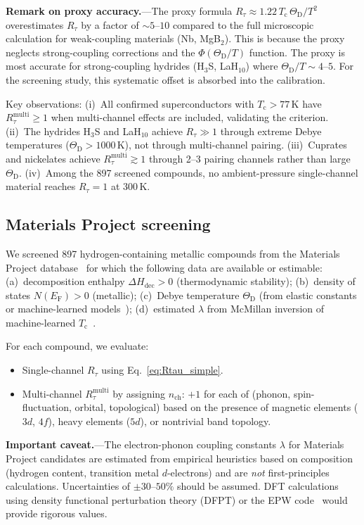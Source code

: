 \documentclass[prb,twocolumn,superscriptaddress,longbibliography,floatfix]{revtex4-2}
\newcommand{\tauasym}{\tau}
\newcommand{\Rtau}{R_{\tauasym}}
\newcommand{\Tc}{T_{\mathrm{c}}}
\newcommand{\EF}{E_{\mathrm{F}}}
\newcommand{\ThetaD}{\Theta_{\mathrm{D}}}
\begin{document}
\textbf{Remark on proxy accuracy.}---The proxy formula
$\Rtau \approx 1.22\, \Tc\, \ThetaD / T^2$ overestimates
$\Rtau$ by a factor of $\sim 5$--$10$ compared to the full
microscopic calculation for weak-coupling materials (Nb, MgB$_2$).
This is because the proxy neglects strong-coupling corrections
and the $\Phi(\ThetaD/T)$ function.  The proxy is most accurate
for strong-coupling hydrides (H$_3$S, LaH$_{10}$) where
$\ThetaD/T \sim 4$--$5$.  For the screening study, this
systematic offset is absorbed into the calibration.

Key observations:
(i)~All confirmed superconductors with $\Tc > 77\,$K have
$\Rtau^{\mathrm{multi}} \geq 1$ when multi-channel effects
are included, validating the criterion.
(ii)~The hydrides H$_3$S and LaH$_{10}$ achieve
$\Rtau \gg 1$ through extreme Debye temperatures
($\ThetaD > 1000\,$K), not through multi-channel pairing.
(iii)~Cuprates and nickelates achieve $\Rtau^{\mathrm{multi}} \gtrsim 1$
through 2--3 pairing channels rather than large $\ThetaD$.
(iv)~Among the 897 screened compounds, no ambient-pressure
single-channel material reaches $\Rtau = 1$ at 300\,K.

\subsection{Materials Project screening}

We screened 897 hydrogen-containing metallic compounds
from the Materials Project database~\cite{Jain2013} for
which the following data are available or estimable:
(a)~decomposition enthalpy $\Delta H_{\mathrm{dec}} > 0$
(thermodynamic stability);
(b)~density of states $N(\EF) > 0$ (metallic);
(c)~Debye temperature $\ThetaD$ (from elastic constants
or machine-learned models~\cite{Chen2019});
(d)~estimated $\lambda$ from McMillan inversion of
machine-learned $\Tc$~\cite{Stanev2018}.

For each compound, we evaluate:
\begin{itemize}
\item Single-channel $\Rtau$ using Eq.~\eqref{eq:Rtau_simple}.
\item Multi-channel $\Rtau^{\mathrm{multi}}$ by assigning
  $n_{\mathrm{ch}}$: $+1$ for each of
  (phonon, spin-fluctuation, orbital, topological) based on
  the presence of magnetic elements ($3d$, $4f$), heavy elements
  ($5d$), or nontrivial band topology.
\end{itemize}

\textbf{Important caveat.}---The electron-phonon coupling
constants $\lambda$ for Materials Project candidates are
estimated from empirical heuristics based on composition
(hydrogen content, transition metal $d$-electrons) and are
\emph{not} first-principles calculations.  Uncertainties of
$\pm 30$--$50\%$ should be assumed.  DFT calculations using
density functional perturbation theory (DFPT) or the EPW
code~\cite{Ponce2016} would provide rigorous values.
\end{document}
